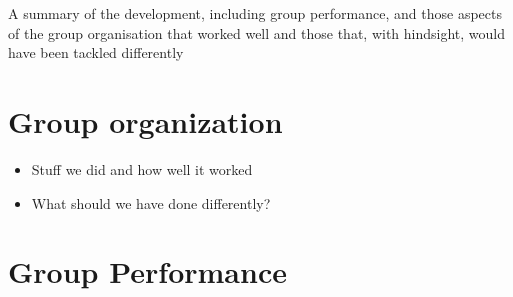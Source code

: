 A summary of the development, including group performance, and those aspects of the group organisation that worked well and those that, with hindsight, would have been tackled differently

\section{Group organization}

\begin{itemize}
    \item Stuff we did and how well it worked
    \item What should we have done differently?
\end{itemize}

\section{Group Performance}
